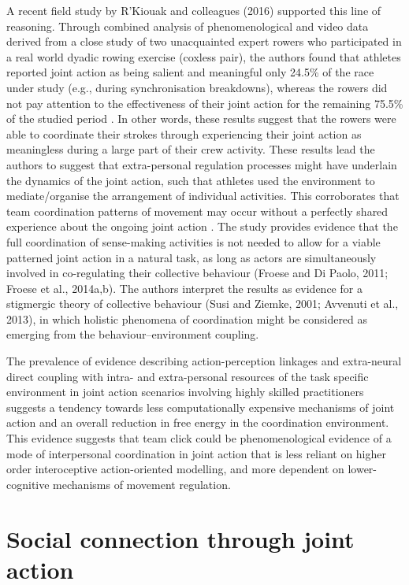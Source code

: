 \begin{CJK}{UTF8}{gbsn}
A recent field study by R'Kiouak and colleagues (2016) supported this line of reasoning.  Through combined analysis of phenomenological and video data derived from a close study of two unacquainted expert rowers who participated in a real world dyadic rowing exercise (coxless pair), the authors found that athletes reported joint action as being salient and meaningful only 24.5\% of the race under study (e.g., during synchronisation breakdowns), whereas the rowers did not pay attention to the effectiveness of their joint action for the remaining 75.5\% of the studied period \citep{RKiouak2016}.  In other words, these results suggest that the rowers were able to coordinate their strokes through experiencing their joint action as meaningless during a large part of their crew activity.  These results lead the authors to suggest that extra-personal regulation processes might have underlain the dynamics of the joint action, such that athletes used the environment to mediate/organise the arrangement of individual activities. This corroborates that team coordination patterns of movement may occur without a perfectly shared experience about the ongoing joint action \citep{Bourbousson2011,Bourbousson2012}. The study provides evidence that the full coordination of sense-making activities is not needed to allow for a viable patterned joint action in a natural task, as long as actors are simultaneously involved in co-regulating their collective behaviour (Froese and Di Paolo, 2011; Froese et al., 2014a,b).  The authors interpret the results as evidence for a stigmergic theory of collective behaviour (Susi and Ziemke, 2001; Avvenuti et al., 2013), in which holistic phenomena of coordination might be considered as emerging from the behaviour–environment coupling.

The prevalence of evidence describing action-perception linkages and extra-neural direct coupling with intra- and extra-personal resources of the task specific environment in joint action scenarios involving highly skilled practitioners suggests a tendency towards less computationally expensive mechanisms of joint action and an overall reduction in free energy in the coordination environment.  This evidence suggests that team click could be phenomenological evidence of a mode of interpersonal coordination in joint action that is less reliant on higher order interoceptive action-oriented modelling, and more dependent on lower-cognitive mechanisms of movement regulation.



\section{Social connection through joint action}


\end{CJK}
